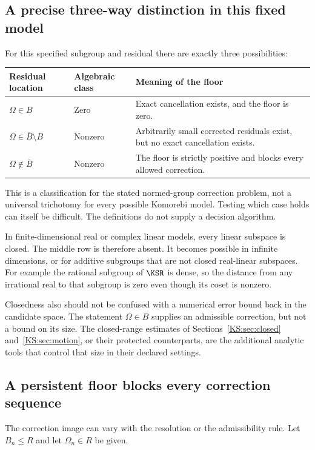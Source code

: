\subsection{A precise three-way distinction in this fixed model}
For this specified subgroup and residual there are exactly three possibilities:
\begin{center}
\begin{tabularx}{\linewidth}{@{}p{.29\linewidth}p{.20\linewidth}X@{}}
\toprule Residual location & Algebraic class & Meaning of the floor\\\midrule
\(\Omega\in B\) & Zero & Exact cancellation exists, and the floor is zero.\\
\(\Omega\in\overline B\setminus B\) & Nonzero & Arbitrarily small corrected residuals exist, but no exact cancellation exists.\\
\(\Omega\notin\overline B\) & Nonzero & The floor is strictly positive and blocks every allowed correction.\\\bottomrule
\end{tabularx}
\end{center}
This is a classification for the stated normed-group correction problem, not a universal trichotomy for every possible Komorebi model. Testing which case holds can itself be difficult. The definitions do not supply a decision algorithm.

In finite-dimensional real or complex linear models, every linear subspace is closed. The middle row is therefore absent. It becomes possible in infinite dimensions, or for additive subgroups that are not closed real-linear subspaces. For example the rational subgroup of \(\KSR\) is dense, so the distance from any irrational real to that subgroup is zero even though its coset is nonzero.

Closedness also should not be confused with a numerical error bound back in the candidate space. The statement \(\Omega\in B\) supplies an admissible correction, but not a bound on its size. The closed-range estimates of Sections~\ref{KS:sec:closed} and~\ref{KS:sec:motion}, or their protected counterparts, are the additional analytic tools that control that size in their declared settings.

\subsection{A persistent floor blocks every correction sequence}
The correction image can vary with the resolution or the admissibility rule. Let \(B_n\le R\) and let \(\Omega_n\in R\) be given.

